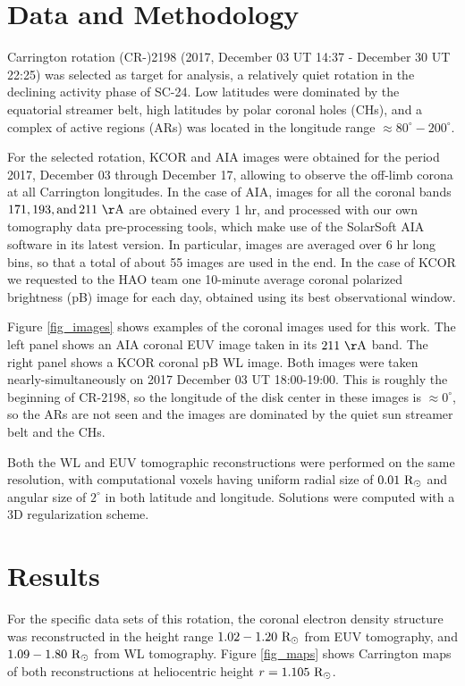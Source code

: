 \documentclass[baaa]{baaa}
\begin{document}
\section{Data and Methodology}\label{method}

Carrington rotation (CR-)2198 (2017, December 03 UT 14:37 - December 30	UT 22:25) was selected as target for analysis, a relatively quiet rotation in the declining activity phase of SC-24. Low latitudes were dominated by the equatorial streamer belt, high latitudes by polar coronal holes (CHs), and a complex of active regions (ARs) was located in the longitude range $\approx 80^\circ-200^\circ$. 

For the selected rotation, KCOR and AIA images were obtained for the period 2017, December 03 through December 17, allowing to observe the off-limb corona at all Carrington longitudes. In the case of AIA, images for all the coronal bands $171, 193, \rm{and}\, 211~\AA$ are obtained every 1 hr, and processed with our own tomography data pre-processing tools, which make use of the SolarSoft AIA software in its latest version. In particular, images are averaged over 6 hr long bins, so that a total of about 55 images are used in the end. In the case of KCOR we requested to the HAO team one 10-minute average coronal polarized brightness (pB) image for each day, obtained using its best observational window. 

Figure \ref{fig_images} shows examples of the coronal images used for this work. The left panel shows an AIA coronal EUV image taken in its $211~\rm{\AA}$ band. The right panel shows a KCOR coronal pB WL image. Both images were taken nearly-simultaneously on 2017 December 03 UT 18:00-19:00. This is roughly the beginning of CR-2198, so the longitude of the disk center in these images is $\approx 0^\circ$, so the ARs are not seen and the images are dominated by the quiet sun streamer belt and the CHs.

Both the WL and EUV tomographic reconstructions were performed on the same resolution, with computational voxels having uniform radial size of $0.01~\rm{R}_\odot$ and angular size of $2^\circ$ in both latitude and longitude. Solutions were computed with a 3D regularization scheme.

\section{Results}

For the specific data sets of this rotation, the coronal electron density structure was reconstructed in the height range $1.02-1.20~\rm{R}_\odot$ from EUV tomography, and $1.09-1.80~\rm{R}_\odot$ from WL tomography. Figure \ref{fig_maps} shows Carrington maps of both reconstructions at heliocentric height $r=1.105~\rm{R}_\odot$. 
\end{document}
